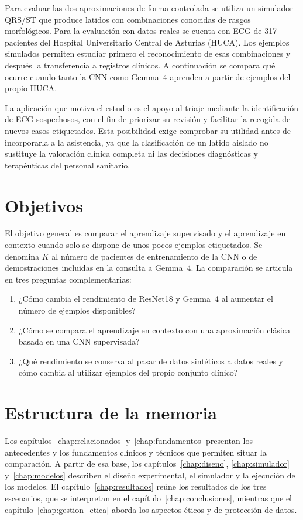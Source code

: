 Para evaluar las dos aproximaciones de forma controlada se utiliza un simulador QRS/ST que produce latidos con combinaciones conocidas de rasgos morfológicos. Para la evaluación con datos reales se cuenta con ECG de 317 pacientes del Hospital Universitario Central de Asturias (HUCA). Los ejemplos simulados permiten estudiar primero el reconocimiento de esas combinaciones y después la transferencia a registros clínicos. A continuación se compara qué ocurre cuando tanto la CNN como Gemma~4 aprenden a partir de ejemplos del propio HUCA.

La aplicación que motiva el estudio es el apoyo al triaje mediante la identificación de ECG sospechosos, con el fin de priorizar su revisión y facilitar la recogida de nuevos casos etiquetados. Esta posibilidad exige comprobar su utilidad antes de incorporarla a la asistencia, ya que la clasificación de un latido aislado no sustituye la valoración clínica completa ni las decisiones diagnósticas y terapéuticas del personal sanitario.

\section{Objetivos}

El objetivo general es comparar el aprendizaje supervisado y el aprendizaje en contexto cuando solo se dispone de unos pocos ejemplos etiquetados. Se denomina \(K\) al número de pacientes de entrenamiento de la CNN o de demostraciones incluidas en la consulta a Gemma~4. La comparación se articula en tres preguntas complementarias:

\begin{enumerate}
  \item ¿Cómo cambia el rendimiento de ResNet18 y Gemma~4 al aumentar el número de ejemplos disponibles?
  \item ¿Cómo se compara el aprendizaje en contexto con una aproximación clásica basada en una CNN supervisada?
  \item ¿Qué rendimiento se conserva al pasar de datos sintéticos a datos reales y cómo cambia al utilizar ejemplos del propio conjunto clínico?
\end{enumerate}

\section{Estructura de la memoria}

Los capítulos~\ref{chap:relacionados} y~\ref{chap:fundamentos} presentan los antecedentes y los fundamentos clínicos y técnicos que permiten situar la comparación. A partir de esa base, los capítulos~\ref{chap:diseno}, \ref{chap:simulador} y~\ref{chap:modelos} describen el diseño experimental, el simulador y la ejecución de los modelos. El capítulo~\ref{chap:resultados} reúne los resultados de los tres escenarios, que se interpretan en el capítulo~\ref{chap:conclusiones}, mientras que el capítulo~\ref{chap:gestion_etica} aborda los aspectos éticos y de protección de datos.
